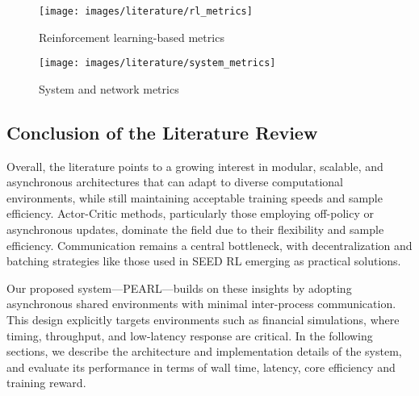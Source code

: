\begin{figure}[htbp]
    \centering
    \begin{minipage}[t]{0.48\textwidth}
        \centering
        \texttt{[image: images/literature/rl\_metrics]}
        \caption{Reinforcement learning-based metrics}
        \label{fig:rl_metrics}
    \end{minipage}
    \hfill
    \begin{minipage}[t]{0.48\textwidth}
        \centering
        \texttt{[image: images/literature/system\_metrics]}
        \caption{System and network metrics}
        \label{fig:system_metrics}
    \end{minipage}
\end{figure}

\subsection{Conclusion of the Literature Review}

Overall, the literature points to a growing interest in modular, scalable, and asynchronous architectures that can adapt to diverse computational environments,
while still maintaining acceptable training speeds and sample efficiency.
Actor-Critic methods, particularly those employing off-policy or asynchronous updates, dominate the field due to their flexibility and sample efficiency.
Communication remains a central bottleneck, with decentralization and batching strategies like those used in SEED RL emerging as practical solutions.

Our proposed system—PEARL—builds on these insights by adopting asynchronous shared environments with minimal inter-process communication.
This design explicitly targets environments such as financial simulations, where timing, throughput,
and low-latency response are critical.
In the following sections, we describe the architecture and implementation details of the system,
and evaluate its performance in terms of wall time, latency, core efficiency and training reward.